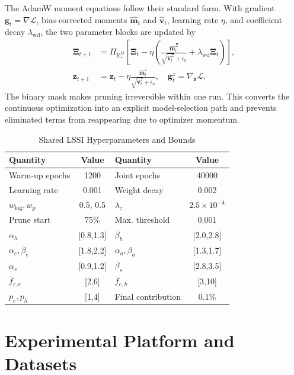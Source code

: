 \documentclass[lettersize,journal]{IEEEtran}
\newcommand{\vect}[1]{\boldsymbol{#1}}
\begin{document}
The AdamW moment equations follow their standard form. With gradient $\vect{g}_t=\nabla\mathcal{L}$, bias-corrected moments $\widehat{\vect{m}}_t$ and $\widehat{\vect{v}}_t$, learning rate $\eta$, and coefficient decay $\lambda_{\mathrm{wd}}$, the two parameter blocks are updated by
\begin{align}
 \vect{\Xi}_{t+1}&=\Pi_{\mathbb{R}_+^M}\!\left[\vect{\Xi}_t-\eta\left(
 \frac{\widehat{\vect{m}}^{\Xi}_t}{\sqrt{\widehat{\vect{v}}^{\Xi}_t}+\epsilon_a}
 +\lambda_{\mathrm{wd}}\vect{\Xi}_t\right)\right], \label{eq:update_xi}\\
 \vect{z}_{t+1}&=\vect{z}_t-\eta
 \frac{\widehat{\vect{m}}^{z}_t}{\sqrt{\widehat{\vect{v}}^{z}_t}+\epsilon_a},\quad
 \vect{g}^{z}_t=\nabla_{\vect z}\mathcal{L}. \label{eq:update_z}
\end{align}
The binary mask makes pruning irreversible within one run. This converts the continuous optimization into an explicit model-selection path and prevents eliminated terms from reappearing due to optimizer momentum.

\begin{table}[t]
\centering
\caption{Shared LSSI Hyperparameters and Bounds}
\label{tab:hyper}
\renewcommand{\arraystretch}{1.08}
\begin{tabular}{lc@{\qquad}lc}
\toprule
Quantity & Value & Quantity & Value \\
\midrule
Warm-up epochs & 1200 & Joint epochs & 40000 \\
Learning rate & 0.001 & Weight decay & 0.002 \\
$w_{\log},w_{\mathrm{p}}$ & 0.5, 0.5 & $\lambda_z$ & $2.5\times10^{-4}$ \\
Prune start & 75\% & Max. threshold & 0.001 \\
$\alpha_h$ & [0.8,1.3] & $\beta_h$ & [2.0,2.8] \\
$\alpha_e,\beta_e$ & [1.8,2.2] & $\alpha_a,\beta_a$ & [1.3,1.7] \\
$\alpha_s$ & [0.9,1.2] & $\beta_s$ & [2.8,3.5] \\
$\bar f_{c,e}$ & [2,6] & $\bar f_{c,h}$ & [3,10] \\
$p_e,p_h$ & [1,4] & Final contribution & 0.1\% \\
\bottomrule
\end{tabular}
\end{table}

\section{Experimental Platform and Datasets}
\end{document}
